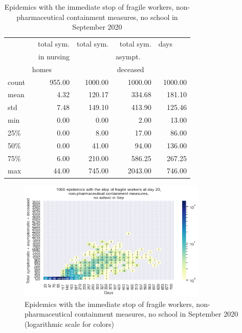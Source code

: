 \documentclass[11pt]{article}
\begin{document}
\begin{table}[H]
\center
\small
\begin{tabular}{lrrrr}
\toprule
{} & total sym.        &  total sym. & total sym.     & days~~~~ \\
{} & in nursing        &                  & asympt.~~~  & \\
{} & homes~~~~~  &                  & deceased~~ & \\
\midrule
count &     955.00 &             1000.00 &                 1000.00 & 1000.00 \\
mean  &       4.32 &              120.17 &                  334.68 &  181.10 \\
std   &       7.48 &              149.10 &                  413.90 &  125.46 \\
min   &       0.00 &                0.00 &                    2.00 &   13.00 \\
25\%   &       0.00 &                8.00 &                   17.00 &   86.00 \\
50\%   &       0.00 &               41.00 &                   94.00 &  136.00 \\
75\%   &       6.00 &              210.00 &                  586.25 &  267.25 \\
max   &      44.00 &              745.00 &                 2043.00 &  746.00 \\
\bottomrule
\end{tabular}

\label{EpidemicsFWsT}
\caption{Epidemics with the immediate stop of fragile workers, non-pharmaceutical containment measures, no school in September 2020}
\end{table}


\begin{figure}[H]
\begin{center}
\includegraphics[width=0.8\textwidth]{HM30_readRunResults1k_with_sFW_at20_plusHMlog.png}
\caption{Epidemics with the immediate stop of fragile workers, non-pharmaceutical containment measures, no school in September 2020 (logarithmic scale for colors)}
\label{EpidemicsFWsHM}
\end{center}
\end{figure}
\end{document}
